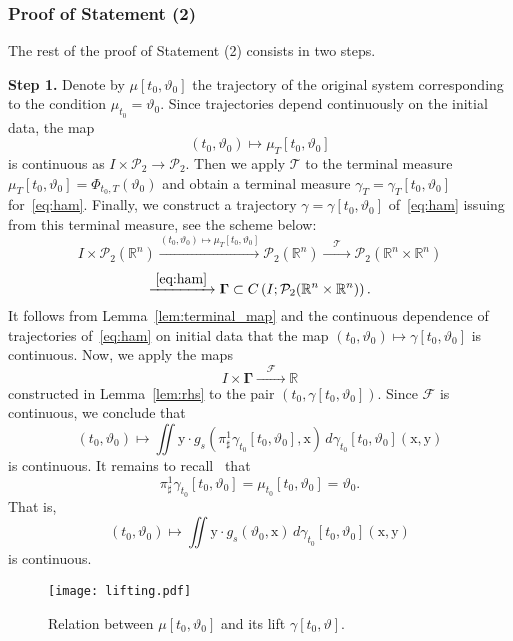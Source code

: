 \documentclass[sn-mathphys-num]{sn-jnl}
\numberwithin{equation}{section}
\theoremstyle{mythm}
\theoremstyle{mydef}
\renewcommand{\d}{\,d}
\renewcommand{\mathbf}[1]{\bm{#1}}
\begin{document}
\subsubsection{Proof of Statement (2)}
\label{sssec:statement2}

The rest of the proof of Statement (2) consists in two steps.

\textbf{Step 1.} Denote by \( \mu[t_0,\vartheta_0] \) the trajectory of the original system corresponding to the condition \( \mu_{t_0}=\vartheta_0 \).
Since trajectories depend continuously on the initial data, the map
\[
  (t_0,\vartheta_0)\mapsto \mu_T[t_0,\vartheta_0]
\]
is continuous as \( I \times \mathcal{P}_{2}\to \mathcal{P}_2 \).
Then we apply \( \mathcal{T} \) to the terminal measure \( \mu_T[t_0,\vartheta_0] = \Phi_{t_0,T}(\vartheta_0) \) and obtain a terminal measure \( \gamma_T=\gamma_T[t_0,\vartheta_0] \) for~\eqref{eq:ham}.
Finally, we construct a trajectory \( \gamma = \gamma[t_0,\vartheta_0] \) of~\eqref{eq:ham} issuing from this terminal measure, see the scheme below:
\[
  I \times \mathcal{P}_2(\mathbb R^n)\xrightarrow{(t_0,\vartheta_0)\mapsto \mu_T[t_0,\vartheta_0]} \mathcal{P}_2(\mathbb R^n) \xrightarrow{\quad\mathcal{T}\quad}\mathcal P_2(\mathbb R^n \times\mathbb R^n)
\]
\[  
\xrightarrow{\;\eqref{eq:ham}\;}\bm \Gamma \subset C\left(I;\mathcal P_2(\mathbb R^n \times\mathbb R^n)\right).
\]
It follows from Lemma~\ref{lem:terminal_map} and the continuous dependence of trajectories of~\eqref{eq:ham} on initial data that the map \( (t_0,\vartheta_0)\mapsto \gamma[t_0,\vartheta_0] \) is continuous.
Now, we apply the maps
\[
  I \times \mathbf{\Gamma} \xrightarrow{\quad\mathcal{F}\quad} \mathbb{R}
\]
constructed in Lemma~\ref{lem:rhs} to the pair \( (t_0,\gamma[t_0,\vartheta_0]) \).
Since \( \mathcal{F} \) is continuous, we conclude that
\[
  (t_0,\vartheta_0) \mapsto \iint \mathrm{y}\cdot g_s\left(\pi^1_{\sharp}\gamma_{t_0}[t_0,\vartheta_0],\mathrm{x}\right)\d \gamma_{t_0}[t_0,\vartheta_0](\mathrm{x},\mathrm{y})
\]
is continuous.
It remains to recall~\cite{chertovskihOptimalControlNonlocal2023} that
\[
\pi^1_{\sharp} \gamma_{t_0}[t_0,\vartheta_0] = \mu_{t_0}[t_0,\vartheta_0] = \vartheta_0.
\]
That is,
\[
  (t_0,\vartheta_0) \mapsto \iint \mathrm{y}\cdot g_s\left(\vartheta_0,\mathrm{x}\right)\d \gamma_{t_0}[t_0,\vartheta_0](\mathrm{x},\mathrm{y})
\]
is continuous.

\begin{figure}
  \centering
  \texttt{[image: lifting.pdf]}
  \caption{Relation between \( \mu[t_0,\vartheta_0] \) and its lift \( \gamma[t_0,\vartheta] \).}
  \label{fig:lift}
\end{figure}
\end{document}
